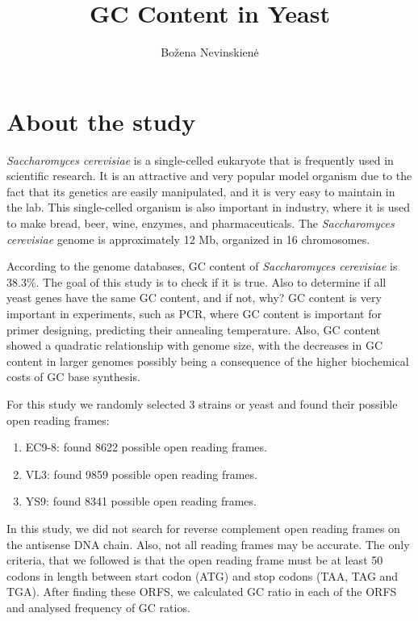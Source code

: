 \documentclass{article}
\begin{document}
\title{GC Content in Yeast}
\author{Bo\v{z}ena Nevinskien\.{e}}
\maketitle

\section{About the study}
\emph{Saccharomyces cerevisiae} is a single-celled eukaryote that is frequently used in scientific research. It is an attractive and very popular model organism due to the fact that its genetics are easily manipulated, and it is very easy to maintain in the lab. 
This single-celled organism is also important in industry, where it is used to make bread, beer, wine, enzymes, and pharmaceuticals. The \emph{Saccharomyces cerevisiae} genome is approximately 12 Mb, organized in 16 chromosomes.


According to the genome databases, GC content of \emph{Saccharomyces cerevisiae} is 38.3\%. 
The goal of this study is to check if it is true. 
Also to determine if all yeast genes have the same GC content, and if not, why? 
GC content is very important in experiments, such as PCR, where GC content is important for primer designing, predicting their annealing temperature. Also, GC content showed a quadratic relationship with genome size, with the decreases in GC content in larger genomes possibly being a consequence of the higher biochemical costs of GC base synthesis.

For this study we randomly selected 3 strains or yeast and found their possible open reading frames:
\begin{enumerate}
	\item EC9-8: found 8622 possible open reading frames.
	\item VL3: found 9859 possible open reading frames.
	\item YS9: found 8341 possible open reading frames.
\end{enumerate}

In this study, we did not search for reverse complement open reading frames on the antisense DNA chain.                    
Also, not all reading frames may be accurate. The only criteria, that we followed is that the open reading frame must be
at least 50 codons in length between start codon (ATG) and stop codons (TAA, TAG and TGA).
After finding these ORFS, we calculated GC ratio in each of the ORFS and analysed frequency of GC ratios.
\end{document}

